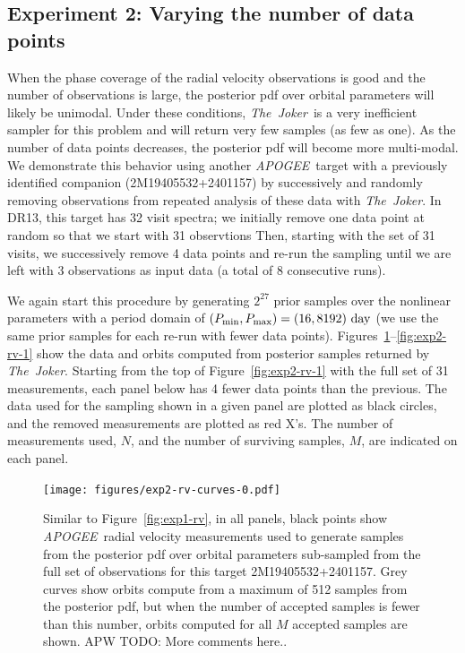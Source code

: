 \documentclass[manuscript, letterpaper]{aastex6}
\newcommand{\project}[1]{\textsl{#1}}
\newcommand{\acronym}[1]{{\small{#1}}}
\newcommand{\apogee}{\project{\acronym{APOGEE}}}
\newcommand{\samplername}{\project{The~Joker}}
\newcommand{\todoapw}[1]{{\color{red}APW TODO: #1}}
\begin{document}
\subsection{Experiment 2: Varying the number of data points}

When the phase coverage of the radial velocity observations is good and the
number of observations is large, the posterior pdf over orbital parameters will
likely be unimodal.
Under these conditions, \samplername\ is a very inefficient sampler for this
problem and will return very few samples (as few as one).
As the number of data points decreases, the posterior pdf will become more
multi-modal.
We demonstrate this behavior using another \apogee\ target with a previously
identified companion (2M19405532+2401157) by successively and randomly removing
observations from repeated analysis of these data with \samplername.
In DR13, this target has 32 visit spectra; we initially remove one data point
at random so that we start with 31 observtions
Then, starting with the set of 31 visits, we successively remove 4 data points
and re-run the sampling until we are left with 3 observations as input data (a
total of 8 consecutive runs).

We again start this procedure by generating $2^{27}$ prior samples over the
nonlinear parameters with a period domain of $(P_{\rm min}, P_{\rm max}) = (16,
8192)~{\rm day}$ (we use the same prior samples for each re-run with fewer data
points).
Figures~\ref{fig:exp2-rv-0}--\ref{fig:exp2-rv-1} show the data and orbits
computed from posterior samples returned by \samplername.
Starting from the top of Figure~\ref{fig:exp2-rv-1} with the full set of 31
measurements, each panel below has 4 fewer data points than the previous.
The data used for the sampling shown in a given panel are plotted as black
circles, and the removed measurements are plotted as red X's.
The number of measurements used, $N$, and the number of surviving samples, $M$,
are indicated on each panel.

\begin{figure}[p]
\begin{center}
\texttt{[image: figures/exp2-rv-curves-0.pdf]}
\end{center}
\caption{%
Similar to Figure~\ref{fig:exp1-rv}, in all panels, black points show \apogee\
radial velocity measurements used to generate samples from the posterior pdf
over orbital parameters sub-sampled from the full set of observations for this
target 2M19405532+2401157.
Grey curves show orbits compute from a maximum of 512 samples from the
posterior pdf, but when the number of accepted samples is fewer than this
number, orbits computed for all $M$ accepted samples are shown.
\todoapw{More comments here..}
\label{fig:exp2-rv-0}}
\end{figure}
\end{document}
